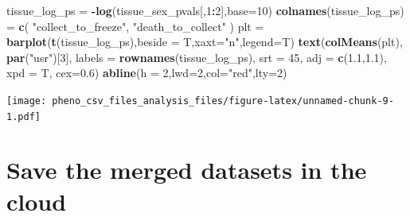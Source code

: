 \documentclass[]{article}
\newenvironment{Shaded}{\begin{snugshade}}{\end{snugshade}}
\newcommand{\KeywordTok}[1]{\textcolor[rgb]{0.13,0.29,0.53}{\textbf{#1}}}
\newcommand{\DataTypeTok}[1]{\textcolor[rgb]{0.13,0.29,0.53}{#1}}
\newcommand{\DecValTok}[1]{\textcolor[rgb]{0.00,0.00,0.81}{#1}}
\newcommand{\FloatTok}[1]{\textcolor[rgb]{0.00,0.00,0.81}{#1}}
\newcommand{\StringTok}[1]{\textcolor[rgb]{0.31,0.60,0.02}{#1}}
\newcommand{\CommentTok}[1]{\textcolor[rgb]{0.56,0.35,0.01}{\textit{#1}}}
\newcommand{\OperatorTok}[1]{\textcolor[rgb]{0.81,0.36,0.00}{\textbf{#1}}}
\newcommand{\NormalTok}[1]{#1}
\begin{document}
\begin{Shaded}
\begin{Highlighting}[]
\NormalTok{tissue_log_ps =}\StringTok{ }\OperatorTok{-}\KeywordTok{log}\NormalTok{(tissue_sex_pvals[,}\DecValTok{1}\OperatorTok{:}\DecValTok{2}\NormalTok{],}\DataTypeTok{base=}\DecValTok{10}\NormalTok{)}
\KeywordTok{colnames}\NormalTok{(tissue_log_ps) =}\StringTok{ }\KeywordTok{c}\NormalTok{(}
  \StringTok{"collect_to_freeze"}\NormalTok{,}
  \StringTok{"death_to_collect"}
\NormalTok{)}
\NormalTok{plt =}\StringTok{ }\KeywordTok{barplot}\NormalTok{(}\KeywordTok{t}\NormalTok{(tissue_log_ps),}\DataTypeTok{beside =}\NormalTok{ T,}\DataTypeTok{xaxt=}\StringTok{"n"}\NormalTok{,}\DataTypeTok{legend=}\NormalTok{T)}
\KeywordTok{text}\NormalTok{(}\KeywordTok{colMeans}\NormalTok{(plt), }\KeywordTok{par}\NormalTok{(}\StringTok{"usr"}\NormalTok{)[}\DecValTok{3}\NormalTok{], }\DataTypeTok{labels =} \KeywordTok{rownames}\NormalTok{(tissue_log_ps), }
     \DataTypeTok{srt =} \DecValTok{45}\NormalTok{, }\DataTypeTok{adj =} \KeywordTok{c}\NormalTok{(}\FloatTok{1.1}\NormalTok{,}\FloatTok{1.1}\NormalTok{), }\DataTypeTok{xpd =}\NormalTok{ T, }\DataTypeTok{cex=}\FloatTok{0.6}\NormalTok{)}
\KeywordTok{abline}\NormalTok{(}\DataTypeTok{h =} \DecValTok{2}\NormalTok{,}\DataTypeTok{lwd=}\DecValTok{2}\NormalTok{,}\DataTypeTok{col=}\StringTok{"red"}\NormalTok{,}\DataTypeTok{lty=}\DecValTok{2}\NormalTok{)}
\end{Highlighting}
\end{Shaded}

\texttt{[image: pheno\_csv\_files\_analysis\_files/figure-latex/unnamed-chunk-9-1.pdf]}

\begin{Shaded}
\end{Shaded}

\section{Save the merged datasets in the
cloud}\label{save-the-merged-datasets-in-the-cloud}
\end{document}
